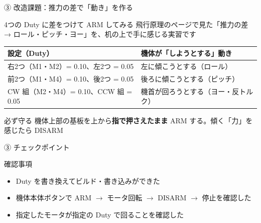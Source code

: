 \begin{frame}{③ 改造課題：推力の差で「動き」を作る}
  \begin{block}{4つの Duty に差をつけて ARM してみる}
    \small 飛行原理のページで見た「推力の差 → ロール・ピッチ・ヨー」を、机の上で手に感じる実習です
  \end{block}

  \vspace{0.2em}

  \begin{table}
    \centering\footnotesize
    \begin{tabular}{l>{\raggedright\arraybackslash}p{52mm}}
      \hline
      \textbf{設定（Duty）} & \textbf{機体が「しようとする」動き} \\
      \hline
      右2つ（M1・M2）= 0.10、左2つ = 0.05 & 左に傾こうとする（ロール） \\
      前2つ（M1・M4）= 0.10、後2つ = 0.05 & 後ろに傾こうとする（ピッチ） \\
      CW 組（M2・M4）= 0.10、CCW 組 = 0.05 & 機首が回ろうとする（ヨー・反トルク） \\
      \hline
    \end{tabular}
  \end{table}

  \vspace{0.2em}

  \begin{alertblock}{必ず守る}
    \footnotesize 機体上部の基板を上から\textbf{指で押さえたまま} ARM する。傾く「力」を感じたら DISARM
  \end{alertblock}
\end{frame}

\begin{frame}{③ チェックポイント}
  \begin{alertblock}{確認事項}
    \begin{itemize}
      \item[$\square$] Duty を書き換えてビルド・書き込みができた
      \item[$\square$] 機体本体ボタンで ARM $\to$ モータ回転 $\to$ DISARM $\to$ 停止を確認した
      \item[$\square$] 指定したモータが指定の Duty で回ることを確認した
    \end{itemize}
  \end{alertblock}
\end{frame}
